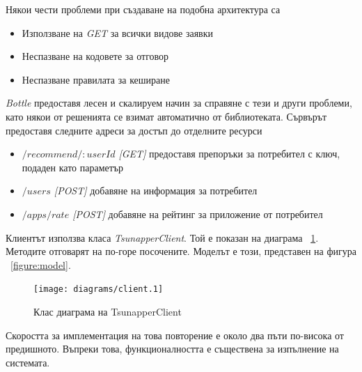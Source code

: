 		Някои чести проблеми при създаване на подобна архитектура са\cite{Vitvar}
		
		\begin{itemize}
			\item Използване на \emph{GET} за всички видове заявки
			\item Неспазване на кодовете за отговор
			\item Неспазване правилата за кеширане
		\end{itemize}
		
		\emph{Bottle} предоставя лесен и скалируем начин за справяне с тези и други проблеми, като някои от решенията се взимат автоматично от библиотеката. Сървърът предоставя следните адреси за достъп до отделните ресурси
		
		\begin{itemize}
			\item \emph{$/recommend/:userId$ [GET]} предоставя препоръки за потребител с ключ, подаден като параметър
			\item \emph{$/users$ [POST]} добавяне на информация за потребител
			\item \emph{$/apps/rate$ [POST]} добавяне на рейтинг за приложение от потребител
		\end{itemize}
		
		Клиентът използва класа \emph{TsunapperClient}. Той е показан на диаграма ~\ref{figure:client}. Методите отговарят на по-горе посочените. Моделът е този, представен на фигура ~\ref{figure:model}.
		
		\begin{figure}[htbp]
			\centering
 			\texttt{[image: diagrams/client.1]}
			\caption{Клас диаграма на TsunapperClient}
			\label{figure:client}
		\end{figure}
		
		Скоростта за имплементация на това повторение е около два пъти по-висока от предишното. Въпреки това, функционалността е съществена за изпълнение на системата.
